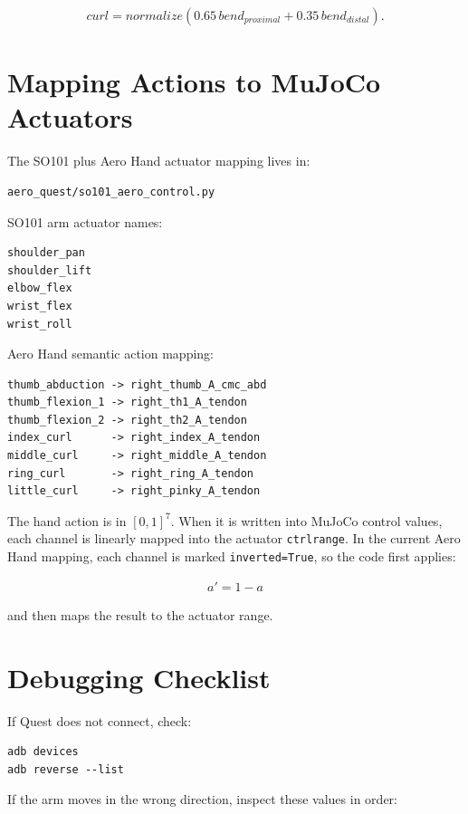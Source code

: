 \documentclass[11pt]{article}
\begin{document}
\begin{align}
curl
  = normalize(0.65\,bend_{proximal}+0.35\,bend_{distal}).
\end{align}

\section{Mapping Actions to MuJoCo Actuators}

The SO101 plus Aero Hand actuator mapping lives in:

\begin{lstlisting}
aero_quest/so101_aero_control.py
\end{lstlisting}

SO101 arm actuator names:

\begin{lstlisting}
shoulder_pan
shoulder_lift
elbow_flex
wrist_flex
wrist_roll
\end{lstlisting}

Aero Hand semantic action mapping:

\begin{lstlisting}
thumb_abduction -> right_thumb_A_cmc_abd
thumb_flexion_1 -> right_th1_A_tendon
thumb_flexion_2 -> right_th2_A_tendon
index_curl      -> right_index_A_tendon
middle_curl     -> right_middle_A_tendon
ring_curl       -> right_ring_A_tendon
little_curl     -> right_pinky_A_tendon
\end{lstlisting}

The hand action is in $[0,1]^7$. When it is written into MuJoCo control values,
each channel is linearly mapped into the actuator \texttt{ctrlrange}. In the
current Aero Hand mapping, each channel is marked \texttt{inverted=True}, so the
code first applies:

\begin{align}
a' = 1-a
\end{align}

and then maps the result to the actuator range.

\section{Debugging Checklist}

If Quest does not connect, check:

\begin{lstlisting}
adb devices
adb reverse --list
\end{lstlisting}

If the arm moves in the wrong direction, inspect these values in order:
\end{document}
